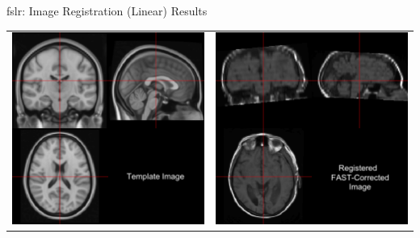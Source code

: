 \documentclass[11pt]{beamer}\usepackage[]{graphicx}\usepackage[]{color}
\begin{document}
\begin{frame}[fragile]{fslr: Image Registration (Linear) Results}

\begin{tabular}{cc}
\includegraphics[width=0.5\linewidth]{Template.png} & \includegraphics[width=0.5\linewidth]{FLIRT_Reg_Image.png}
\end{tabular}

\end{frame}
\end{document}
